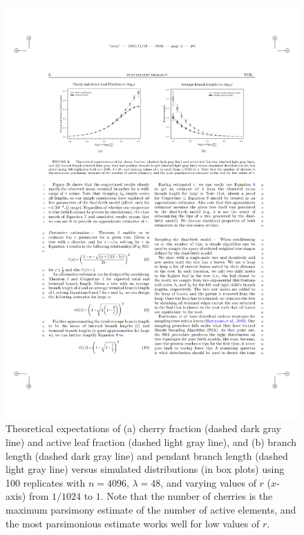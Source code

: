 \begin{figure} %
\centering
\includegraphics[width=\textwidth]{figs/dualbirth-c-vs-r}
\caption[Theoretical Expectations]
{Theoretical expectations of (a) cherry fraction (dashed dark gray line) and active leaf fraction (dashed light gray line), and (b) branch length (dashed dark gray line) and pendant branch length (dashed light gray line) versus simulated distributions (in box plots) using 100 replicates with $n=4096$, $\lambda=48$, and varying values of $r$ ($x$-axis) from $1/1024$ to $1$. Note that the number of cherries is the maximum parsimony estimate of the number of active elements, and the most parsimonious estimate works well for low values of $r$.}
\label{fig:dualbirth-c-vs-r}
\end{figure}

